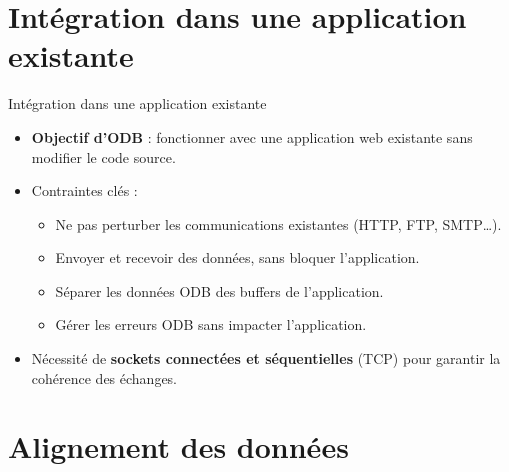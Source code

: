 \documentclass[aspectratio=43,8pt]{beamer}
\begin{document}
\section{Intégration dans une application existante}
\begin{frame}{Intégration dans une application existante}
\begin{card}
    \begin{itemize}
        \item \textbf{Objectif d'ODB} : fonctionner avec une application web existante sans modifier le code source.
        \item Contraintes clés :
        \begin{itemize}
            \item Ne pas perturber les communications existantes (HTTP, FTP, SMTP…).
            \item Envoyer et recevoir des données, sans bloquer l'application.
            \item Séparer les données ODB des buffers de l'application.
            \item Gérer les erreurs ODB sans impacter l'application.
        \end{itemize}
        \item Nécessité de \textbf{sockets connectées et séquentielles} (TCP) pour garantir la cohérence des échanges.
    \end{itemize}
\end{card}
\end{frame}

\section{Alignement des données}
\end{document}
